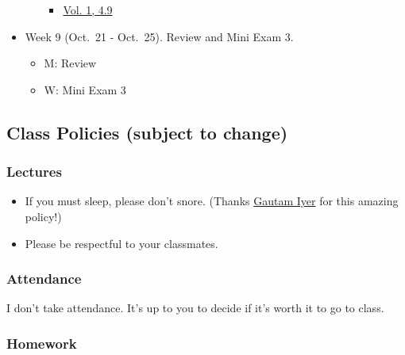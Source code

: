 \documentclass[
]{article}
\providecommand{\tightlist}{%
  \setlength{\itemsep}{0pt}\setlength{\parskip}{0pt}}
\begin{document}
\begin{itemize}
\begin{itemize}
    \begin{itemize}
    \tightlist
    \item
      \href{https://openstax.org/books/calculus-volume-1/pages/4-9-newtons-method}{Vol. 1, 4.9}
    \end{itemize}
  \end{itemize}
\item
  Week 9 (Oct.~21 - Oct.~25). Review and Mini Exam 3.

  \begin{itemize}
  \tightlist
  \item
    M: Review
  \item
    W: Mini Exam 3
  \end{itemize}
\end{itemize}

\hypertarget{class-policies-subject-to-change}{%
\subsection*{Class Policies (subject to change)}\label{class-policies-subject-to-change}}

\hypertarget{lectures}{%
\subsubsection*{Lectures}\label{lectures}}

\begin{itemize}
\tightlist
\item
  If you must sleep, please don't snore. (Thanks \href{https://www.math.cmu.edu/~gautam/}{Gautam Iyer} for this amazing policy!)
\item
  Please be respectful to your classmates.
\end{itemize}

\hypertarget{attendance}{%
\subsubsection*{Attendance}\label{attendance}}

I don't take attendance. It's up to you to decide if it's worth it to go to
class.

\hypertarget{homework}{%
\subsubsection*{Homework}\label{homework}}
\end{document}
